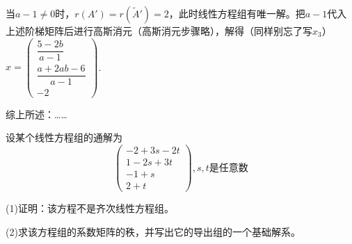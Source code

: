 \documentclass[a4paper]{report}
\begin{document}
\begin{jie}
当$a-1\neq 0$时，$r(A')=r(\widetilde{A}')=2$，此时线性方程组有唯一解。把$a-1$代入上述阶梯矩阵后进行高斯消元（高斯消元步骤略），解得（同样别忘了写$x_3$）$x
=\begin{pmatrix}
\dfrac{5-2b}{a-1}\\[2pt] \dfrac{a+2ab-6}{a-1}\\[2pt] -2
 \end{pmatrix}
$.

综上所述：……
\end{jie}

\EX 设某个线性方程组的通解为
\begin{equation*}
\begin{pmatrix}
-2+3s-2t\\
1-2s+3t\\
-1+s\\
2+t
\end{pmatrix},s,t\text{是任意数}
\end{equation*}

(1)证明：该方程不是齐次线性方程组。

(2)求该方程组的系数矩阵的秩，并写出它的导出组的一个基础解系。
\end{document}
